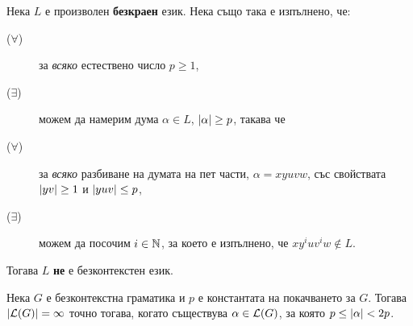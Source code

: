 \begin{cor}
  \label{cor:pumping-context-free}
  Нека $L$ е произволен {\bf безкраен} език. Нека също така е изпълнено, че:
  \begin{description}
  \item[($\forall$)]
    за {\em всяко} естествено число $p \geq 1$,
  \item[($\exists$)]
    можем да намерим дума $\alpha \in L$, $\vert{\alpha}\vert\geq p$, такава че
  \item[($\forall$)]
    за {\em всяко} разбиване на думата на пет части, $\alpha = xyuvw$, със свойствата $\vert{yv}\vert \geq 1$ и $\vert{yuv}\vert \leq p$,
  \item[($\exists$)]
    можем да посочим $i \in \mathbb{N}$, за което е изпълнено, че $xy^iuv^iw \not\in L$.
  \end{description}  
  Тогава $L$ {\bf не} е безконтекстен език.
\end{cor}

\begin{cor}
  Нека $G$ е безконтекстна граматика и $p$ е константата на покачването за $G$.
  Тогава $\vert{\mathcal{L}(G)}\vert = \infty$ точно тогава, когато съществува $\alpha \in \mathcal{L}(G)$, за която $p \leq \vert{\alpha}\vert < 2p$.
\end{cor}



